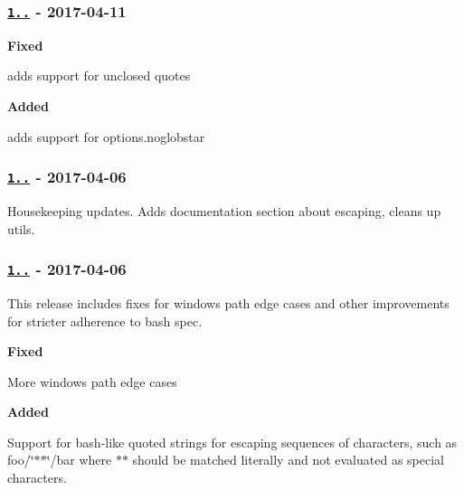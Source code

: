 \subsubsection*{\href{https://github.com/micromatch/nanomatch/compare/1.0.4...1.1.0}{\tt 1..} -\/ 2017-\/04-\/11}

{\bfseries Fixed}


\begin{DoxyItemize}
\item adds support for unclosed quotes
\end{DoxyItemize}

{\bfseries Added}


\begin{DoxyItemize}
\item adds support for {\ttfamily options.\+noglobstar}
\end{DoxyItemize}

\subsubsection*{\href{https://github.com/micromatch/nanomatch/compare/1.0.3...1.0.4}{\tt 1..} -\/ 2017-\/04-\/06}

Housekeeping updates. Adds documentation section about escaping, cleans up utils.

\subsubsection*{\href{https://github.com/micromatch/nanomatch/compare/1.0.1...1.0.3}{\tt 1..} -\/ 2017-\/04-\/06}

This release includes fixes for windows path edge cases and other improvements for stricter adherence to bash spec.

{\bfseries Fixed}


\begin{DoxyItemize}
\item More windows path edge cases
\end{DoxyItemize}

{\bfseries Added}


\begin{DoxyItemize}
\item Support for bash-\/like quoted strings for escaping sequences of characters, such as {\ttfamily foo/\char`\"{}$\ast$$\ast$\char`\"{}/bar} where {\ttfamily $\ast$$\ast$} should be matched literally and not evaluated as special characters.
\end{DoxyItemize}

